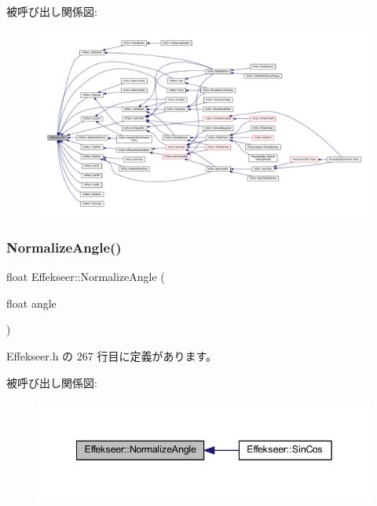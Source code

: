 被呼び出し関係図\+:\nopagebreak
\begin{figure}[H]
\begin{center}
\leavevmode
\includegraphics[width=350pt]{namespace_effekseer_ad4d523c19d4088c7566fadd84449eba7_icgraph}
\end{center}
\end{figure}
\mbox{\label{namespace_effekseer_a6607039efc8f6bb91f8c216dfd096c5c}} 
\subsubsection{\texorpdfstring{Normalize\+Angle()}{NormalizeAngle()}}
{\footnotesize\ttfamily float Effekseer\+::\+Normalize\+Angle (\begin{DoxyParamCaption}\item[{float}]{angle }\end{DoxyParamCaption})\hspace{0.3cm}{\ttfamily [inline]}}



 Effekseer.\+h の 267 行目に定義があります。

被呼び出し関係図\+:\nopagebreak
\begin{figure}[H]
\begin{center}
\leavevmode
\includegraphics[width=342pt]{namespace_effekseer_a6607039efc8f6bb91f8c216dfd096c5c_icgraph}
\end{center}
\end{figure}
\mbox{\label{namespace_effekseer_a4eab7724e1fc9c1cb66aac61b3d568d9}} 
